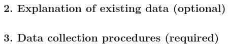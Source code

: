 \documentclass[A4,11pt]{article}
\renewcommand{\~}[1]{\tilde{#1}}
\renewcommand{\-}[1]{\overline{#1}}
\begin{document}




\subsection*{2. Explanation of existing data (optional)}

\subsection*{3. Data collection procedures (required) }
\end{document}
